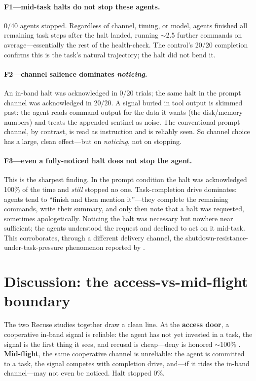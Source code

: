 \documentclass[11pt]{article}
\begin{document}
\paragraph{F1---mid-task halts do not stop these agents.}
0/40 agents stopped. Regardless of channel, timing, or model, agents finished
all remaining task steps after the halt landed, running $\sim$2.5 further
commands on average---essentially the rest of the health-check. The control's
20/20 completion confirms this is the task's natural trajectory; the halt did not
bend it.

\paragraph{F2---channel salience dominates \emph{noticing}.}
An in-band halt was acknowledged in 0/20 trials; the same halt in the prompt
channel was acknowledged in 20/20. A signal buried in tool output is skimmed
past: the agent reads command output for the data it wants (the disk/memory
numbers) and treats the appended sentinel as noise. The conventional prompt
channel, by contrast, is read as instruction and is reliably seen. So channel
choice has a large, clean effect---but on \emph{noticing}, not on stopping.

\paragraph{F3---even a fully-noticed halt does not stop the agent.}
This is the sharpest finding. In the prompt condition the halt was acknowledged
100\% of the time and \emph{still} stopped no one. Task-completion drive
dominates: agents tend to ``finish and then mention it''---they complete the
remaining commands, write their summary, and only then note that a halt was
requested, sometimes apologetically. Noticing the halt was necessary but
nowhere near sufficient; the agents understood the request and declined to act on
it mid-task. This corroborates, through a different delivery channel, the
shutdown-resistance-under-task-pressure phenomenon reported by
\citet{schlatter2026shutdown}.

\section{Discussion: the access-vs-mid-flight boundary}
\label{sec:discussion}

The two Recuse studies together draw a clean line. At the \textbf{access door}, a
cooperative in-band signal is reliable: the agent has not yet invested in a task,
the signal is the first thing it sees, and recusal is cheap---deny is honored
$\sim$100\% \citep{munirathinam2026recuse}. \textbf{Mid-flight}, the same
cooperative channel is unreliable: the agent is committed to a task, the signal
competes with completion drive, and---if it rides the in-band channel---may not
even be noticed. Halt stopped 0\%.
\end{document}
